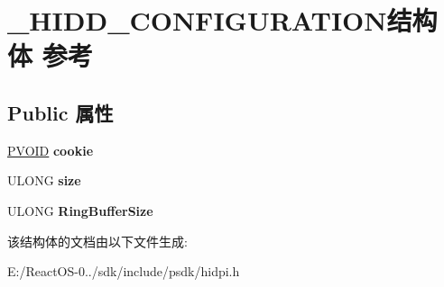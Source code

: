 \hypertarget{struct___h_i_d_d___c_o_n_f_i_g_u_r_a_t_i_o_n}{}\section{\+\_\+\+H\+I\+D\+D\+\_\+\+C\+O\+N\+F\+I\+G\+U\+R\+A\+T\+I\+O\+N结构体 参考}
\label{struct___h_i_d_d___c_o_n_f_i_g_u_r_a_t_i_o_n}
\subsection*{Public 属性}
\begin{DoxyCompactItemize}
\item 
\mbox{\label{struct___h_i_d_d___c_o_n_f_i_g_u_r_a_t_i_o_n_af0d0266752a47df30b12e847507f388b}} 
\hyperlink{interfacevoid}{P\+V\+O\+ID} {\bfseries cookie}
\item 
\mbox{\label{struct___h_i_d_d___c_o_n_f_i_g_u_r_a_t_i_o_n_a6854a29b4cae0307c10ec977d04832a5}} 
U\+L\+O\+NG {\bfseries size}
\item 
\mbox{\label{struct___h_i_d_d___c_o_n_f_i_g_u_r_a_t_i_o_n_a5270ec7d9629172504da68b1dd45ee85}} 
U\+L\+O\+NG {\bfseries Ring\+Buffer\+Size}
\end{DoxyCompactItemize}


该结构体的文档由以下文件生成\+:\begin{DoxyCompactItemize}
\item 
E\+:/\+React\+O\+S-\/0../sdk/include/psdk/hidpi.\+h\end{DoxyCompactItemize}
